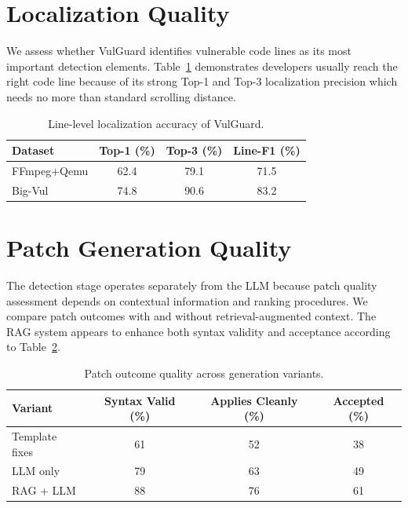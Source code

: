 \section{Localization Quality}
We assess whether VulGuard identifies vulnerable code lines as its most important detection elements. Table~\ref{tab:localization} demonstrates developers usually reach the right code line because of its strong Top-1 and Top-3 localization precision which needs no more than standard scrolling distance.

\begin{table}[htbp]
\centering
\renewcommand{\arraystretch}{1.1}
\begin{tabular}{l|c|c|c}
\hline
\textbf{Dataset} & \textbf{Top-1 (\%)} & \textbf{Top-3 (\%)} & \textbf{Line-F1 (\%)} \\
\hline
FFmpeg+Qemu & 62.4 & 79.1 & 71.5 \\
Big-Vul & 74.8 & 90.6 & 83.2 \\
\hline
\end{tabular}
\caption{Line-level localization accuracy of VulGuard.}
\label{tab:localization}
\end{table}

\section{Patch Generation Quality}
The detection stage operates separately from the LLM because patch quality assessment depends on contextual information and ranking procedures. We compare patch outcomes with and without retrieval-augmented context. The RAG system appears to enhance both syntax validity and acceptance according to Table~\ref{tab:patch-quality}.

\begin{table}[htbp]
\centering
\renewcommand{\arraystretch}{1.1}
\begin{tabular}{l|c|c|c}
\hline
\textbf{Variant} & \textbf{Syntax Valid (\%)} & \textbf{Applies Cleanly (\%)} & \textbf{Accepted (\%)} \\
\hline
Template fixes & 61 & 52 & 38 \\
LLM only & 79 & 63 & 49 \\
RAG + LLM & 88 & 76 & 61 \\
\hline
\end{tabular}
\caption{Patch outcome quality across generation variants.}
\label{tab:patch-quality}
\end{table}

